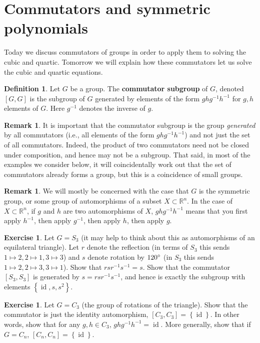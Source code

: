 \documentclass[reqno, 12pt, letter]{article}
\theoremstyle{plain}
\theoremstyle{definition}
\newtheorem{definition}[theorem]{Definition}
\newtheorem{remark}[theorem]{Remark}
\newtheorem{exercise}[theorem]{Exercise}
\theoremstyle{remark}
\numberwithin{equation}{section}
\newcommand\br{{\mathbb R}}
\DeclareMathOperator\id{id}
\begin{document}
\section{Commutators and symmetric polynomials}
Today we discuss commutators of groups in order to apply them to solving the cubic and quartic.
Tomorrow we will explain how these commutators let us solve the cubic and quartic equations.
\begin{definition}
	\label{definition:}
	Let $G$ be a group. The {\bf commutator subgroup} of $G$, denoted $\left[ G,G \right]$ is the subgroup of $G$ generated 
	by elements of the form $ghg^{-1}h^{-1}$ for $g, h$ elements of $G$.
	Here $g^{-1}$ denotes the inverse of $g$.
\end{definition}
\begin{remark}
	\label{remark:}
	It is important that the commutator subgroup is the group {\em generated}
	by all commutators (i.e., all elements of the form $ghg^{-1}h^{-1}$)
	and not just the set of all commutators.
	Indeed, the product of two commutators need not be closed under composition,
	and hence may not be a subgroup.
	That said, in most of the examples we consider below,
	it will coincidentally work out that the set of commutators already forms
	a group, but this is a coincidence of small groups.
\end{remark}

\begin{remark}
	\label{remark:}
	We will mostly be concerned with the case that $G$ is the symmetric group, or some group of automorphisms of a subset $X \subset \br^n$.
	In the case of $X \subset \br^n$, if $g$ and $h$ are two automorphisms of $X$, $ghg^{-1}h^{-1}$ means that you first apply $h^{-1}$, then apply $g^{-1}$, then
	apply $h$, then apply $g$.
\end{remark}
\begin{exercise}
	\label{exercise:}
	Let $G = S_3$ (it may help to think about this as automorphisms of an equilateral triangle).
	Let $r$ denote the reflection (in terms of $S_3$ this sends $1 \mapsto 2, 2 \mapsto 1, 3\mapsto 3$)
	and $s$ denote rotation by $120 \degree$ (in $S_3$ this sends $1 \mapsto 2, 2 \mapsto 3, 3 \mapsto 1$).
	Show that $rsr^{-1}s^{-1} = s$.
	Show that the commutator $\left[ S_3, S_3 \right]$ is generated by $s = rsr^{-1}s^{-1}$, and hence is exactly the subgroup
	with elements $\left\{ \id, s, s^2 \right\}$.
\end{exercise}
\begin{exercise}
	\label{exercise:}
	Let $G = C_3$ (the group of rotations of the triangle). Show that the commutator is just the identity automorphism, $\left[ C_3, C_3 \right] = \left\{ \id \right\}$.
	In other words, show that for any $g, h \in C_3$, $ghg^{-1}h^{-1} = \id$.
	More generally, show that if $G = C_n$, $\left[ C_n, C_n \right] = \left\{ \id \right\}$.
\end{exercise}
\end{document}
